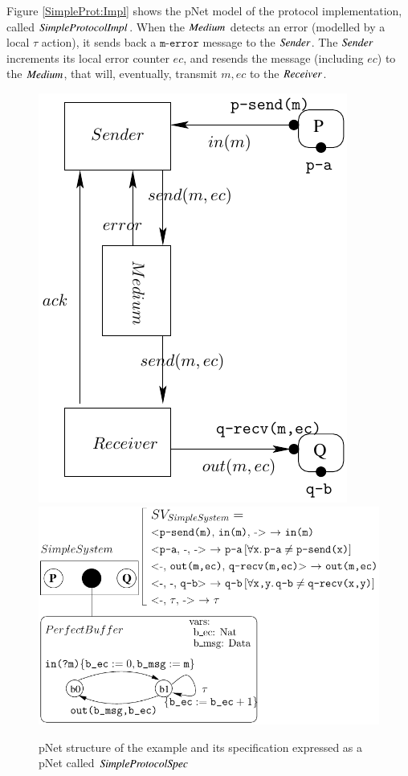 \documentclass{elsarticle}
\begin{document}
\fussy
Figure \ref{SimpleProt:Impl} shows the pNet model of the protocol implementation, called $\symb{SimpleProtocolImpl}$. When the $\symb{Medium}$ detects an error (modelled by a local $\tau$ action), it sends back a $\texttt{m-error}$ message to the $\symb{Sender}$. The $\symb{Sender}$ increments its local error counter $ec$, and resends the message (including $ec$) to the $\symb{Medium}$, that will, eventually, transmit $m,ec$ to the $\symb{Receiver}$. 
\sloppy

\begin{figure}[t]
   \includegraphics[width=.37\textwidth]{XFIG/SimpleProt-Schema1.pdf}
   \includegraphics[width=.62\textwidth]{XFIG/SimpleProt2-Spec.pdf}
   \caption{pNet structure of the example and its specification expressed as a pNet called $\symb{SimpleProtocolSpec}$ }
   \label{SimpleProt:Spec}
\end{figure}
\end{document}
